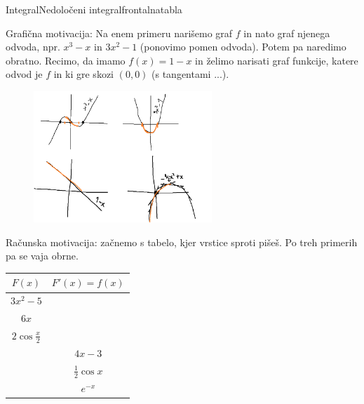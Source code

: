 \begin{priprava}{}{}{Integral}{Nedoločeni integral}{frontalna}{tabla}

Grafična motivacija:  Na enem primeru narišemo graf $ f $ in nato graf njenega odvoda, npr. $ x^3 - x $ in $ 3x^2 - 1 $ (ponovimo pomen odvoda). Potem pa naredimo obratno. Recimo, da imamo $ f(x) = 1 - x $ in želimo narisati graf funkcije, katere odvod je $ f $ in ki gre skozi $ (0, 0) $ (s tangentami ...).

\begin{figure}[h]
    \centering
    \includegraphics[width=0.6\textwidth]{slike/graf_odvod_integral.png}
\end{figure}

Računska motivacija: začnemo s tabelo, kjer vrstice sproti pišeš. Po treh primerih pa se vaja obrne.  

\begin{center}
\begin{tabular}{ |c|c| } 
     $ F(x) $ & $ F'(x) = f(x) $ \\
     \hline \hline $ 3x^2 - 5 $ & \\
     \hline $ 6x $ & \\
     \hline $ 2 \cos{\frac{x}{2}} $ & \\
     \hline & $ 4x - 3 $ \\
     \hline & $ \frac{1}{2} \cos x $ \\
     \hline & $ e^{-x} $ \\
     \hline
\end{tabular}
\end{center}



\end{priprava}
